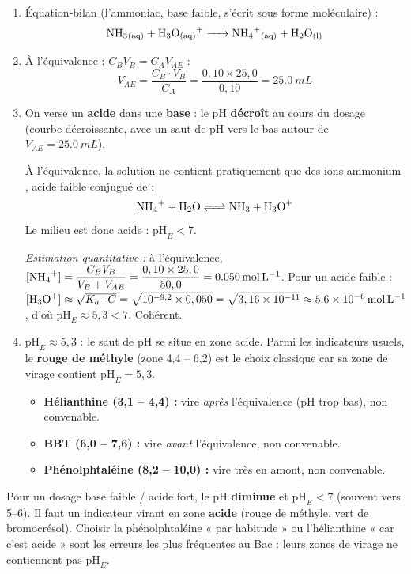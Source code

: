 \documentclass[11pt]{article}
\begin{document}
\begin{corrige}
\begin{enumerate}
\item Équation-bilan (l'ammoniac, base faible, s'écrit sous forme moléculaire) :
\[ \ce{NH3_{(aq)} + H3O+_{(aq)} -> NH4+_{(aq)} + H2O_{(l)}} \]

\item À l'équivalence : $C_B V_B = C_A V_{AE}$ :
\[ V_{AE} = \frac{C_B \cdot V_B}{C_A} = \frac{0,10 \times 25,0}{0,10} = \SI{25,0}{mL} \]

\item On verse un \textbf{acide} dans une \textbf{base} : le pH \textbf{décroît} au cours du dosage (courbe décroissante, avec un saut de pH vers le bas autour de $V_{AE} = \SI{25,0}{mL}$).

À l'équivalence, la solution ne contient pratiquement que des ions ammonium , acide faible conjugué de  :
\[ \ce{NH4+ + H2O <=> NH3 + H3O+} \]
Le milieu est donc acide : $\mathrm{pH}_E < 7$.

\emph{Estimation quantitative :} à l'équivalence, $[\ce{NH4+}] = \dfrac{C_B V_B}{V_B + V_{AE}} = \dfrac{0,10 \times 25,0}{50,0} = \SI{0,050}{mol.L^{-1}}$.
Pour un acide faible : $[\ce{H3O+}] \approx \sqrt{K_a \cdot C} = \sqrt{10^{-9,2} \times 0,050} = \sqrt{3,16 \times 10^{-11}} \approx \SI{5,6e-6}{mol.L^{-1}}$, d'où $\mathrm{pH}_E \approx 5,3 < 7$. Cohérent.

\item $\mathrm{pH}_E \approx 5,3$ : le saut de pH se situe en zone acide. Parmi les indicateurs usuels, le \textbf{rouge de méthyle} (zone 4,4 -- 6,2) est le choix classique car sa zone de virage contient $\mathrm{pH}_E = 5,3$.
\begin{itemize}
\item \textbf{Hélianthine (3,1 -- 4,4) :} vire \emph{après} l'équivalence (pH trop bas), non convenable.
\item \textbf{BBT (6,0 -- 7,6) :} vire \emph{avant} l'équivalence, non convenable.
\item \textbf{Phénolphtaléine (8,2 -- 10,0) :} vire très en amont, non convenable.
\end{itemize}
\end{enumerate}
\end{corrige}

\begin{attention}
Pour un dosage base faible / acide fort, le pH \textbf{diminue} et $\mathrm{pH}_E < 7$ (souvent vers 5--6). Il faut un indicateur virant en zone \textbf{acide} (rouge de méthyle, vert de bromocrésol). Choisir la phénolphtaléine « par habitude » ou l'hélianthine « car c'est acide » sont les erreurs les plus fréquentes au Bac : leurs zones de virage ne contiennent pas $\mathrm{pH}_E$.
\end{attention}
\end{document}
